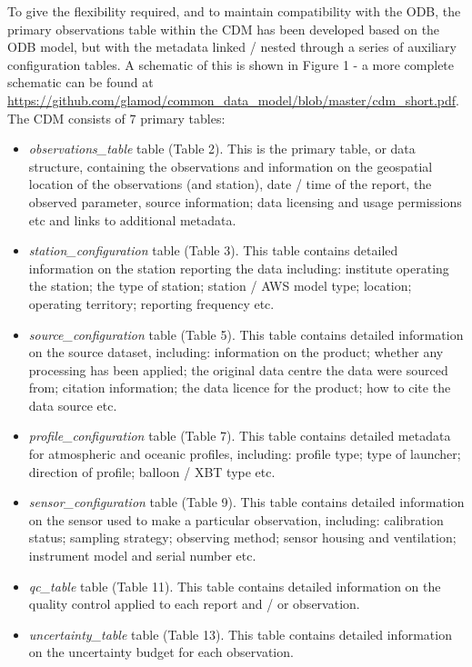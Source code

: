 \documentclass[a4paper]{article}
\begin{document}
To give the flexibility required, and to maintain compatibility with the ODB, the primary observations table within the CDM has been developed based on the ODB model, but with the metadata linked / nested through a series of auxiliary configuration tables. A schematic of this is shown in Figure 1 - a more complete schematic can be found at \url{https://github.com/glamod/common_data_model/blob/master/cdm_short.pdf}. The CDM consists of 7 primary tables:\\
\begin{itemize}
\item \textit{observations\_table} table (Table 2). This is the primary table, or data structure, containing the observations and information on the geospatial location of the observations (and station), date / time of the report, the observed parameter, source information; data licensing and usage permissions etc and links to additional metadata.
\item \textit{station\_configuration} table (Table 3). This table contains detailed information on the station reporting the data including: institute operating the station; the type of station; station / AWS model type; location; operating territory; reporting frequency etc.
\item \textit{source\_configuration} table (Table 5). This table contains detailed information on the source dataset, including: information on the product; whether any processing has been applied; the original data centre the data were sourced from; citation information; the data licence for the product; how to cite the data source etc.
\item \textit{profile\_configuration} table (Table 7). This table contains detailed metadata for atmospheric and oceanic profiles, including: profile type; type of launcher; direction of profile; balloon / XBT type etc.
\item \textit{sensor\_configuration} table (Table 9). This table contains detailed information on the sensor used to make a particular observation, including: calibration status; sampling strategy; observing method; sensor housing and ventilation; instrument model and serial number etc.
\item \textit{qc\_table} table (Table 11). This table contains detailed information on the quality control applied to each report and / or observation.
\item \textit{uncertainty\_table} table (Table 13). This table contains detailed information on the uncertainty budget for each observation.
\end{itemize}
\end{document}
